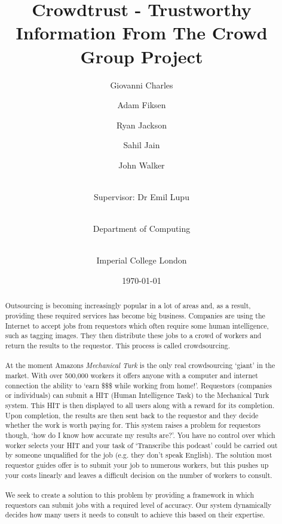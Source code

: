 \documentclass[11pt]{article}
\begin{document}
\title{Crowdtrust - Trustworthy Information From The Crowd\\ Group Project }

\author{Giovanni Charles \and Adam Fiksen \and Ryan Jackson \and Sahil Jain \and John Walker \and \\ Supervisor: Dr Emil Lupu \and \\ Department of Computing \and \\ Imperial College London}


\date{\today}         %

\maketitle           %
\newpage


\begin{abstract}
\noindent Outsourcing is becoming increasingly popular in a lot of areas and, as a result, providing these required services has 
become big business. Companies are using the Internet to accept jobs from requestors which often require some human intelligence,
such as tagging images. They then distribute these jobs to a crowd of workers and return the results to the requestor. This process is called
crowdsourcing. %
\\
\\
\noindent At the moment Amazons \emph{Mechanical Turk} is the only real crowdsourcing `giant' in the market. With over 500,000 workers it offers
anyone with a computer and internet connection the ability to `earn \$\$\$ while working from home!'. Requestors (companies or individuals) 
can submit a HIT (Human Intelligence Task) to the Mechanical Turk system. This HIT is then displayed to all users along with a 
reward for its completion. Upon completion, the results are then sent back to the requestor and they decide whether the work is worth paying for. 
This system raises a problem for requestors though, `how do I know how accurate my results are?'. You have no control over which worker selects your HIT and
your task of `Transcribe this podcast' could be carried out by someone unqualified for the job (e.g. they don't speak English). The solution
most requestor guides offer is to submit your job to numerous workers, but this pushes up your costs linearly and leaves a difficult
decision on the number of workers to consult.
\\
\\
We seek to create a solution to this problem by providing a framework in which requestors can submit jobs with a required level of accuracy. Our
system dynamically decides how many users it needs to consult to achieve this based on their expertise. 
  
\end{abstract}
\end{document}
